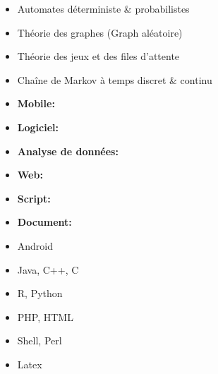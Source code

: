 
\begin{itemize}

\item Automates déterministe \& probabilistes
\item Théorie des graphes (Graph aléatoire)
\item Théorie des jeux et des files d'attente
\item Chaîne de Markov à temps discret \& continu


\end{itemize}



\begin{minipage}{0.29\columnwidth}{}
\begin{itemize}
\item \textbf{Mobile:}
\item \textbf{Logiciel:}
\item \textbf{Analyse de données:}
\item \textbf{Web:}
\item \textbf{Script:}
\item \textbf{Document:}
\end{itemize}
\end{minipage}
\begin{minipage}{0.32\columnwidth}{}
\begin{itemize}
  \item[] Android
  \item[] Java, C++, C
  \item[] R, Python
  \item[] PHP, HTML
  \item[] Shell, Perl
  \item[] Latex
\end{itemize}
\end{minipage}
  

